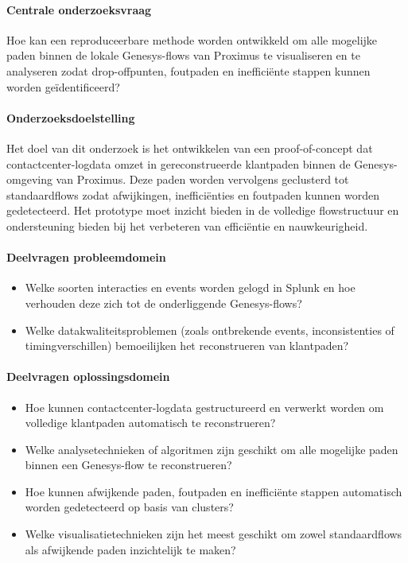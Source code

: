 \paragraph{Centrale onderzoeksvraag}
Hoe kan een reproduceerbare methode worden ontwikkeld om alle mogelijke paden binnen de lokale Genesys-flows van Proximus te visualiseren en te analyseren zodat drop-offpunten, foutpaden en inefficiënte stappen kunnen worden geïdentificeerd?
\paragraph{Onderzoeksdoelstelling}
Het doel van dit onderzoek is het ontwikkelen van een proof-of-concept dat contactcenter-logdata omzet in gereconstrueerde klantpaden binnen de Genesys-omgeving van Proximus. Deze paden worden vervolgens geclusterd tot standaardflows zodat afwijkingen, ineffici\"enties en foutpaden kunnen worden gedetecteerd. Het prototype moet inzicht bieden in de volledige flowstructuur en ondersteuning bieden bij het verbeteren van effici\"entie en nauwkeurigheid.
\paragraph{Deelvragen probleemdomein}
\begin{itemize}
  \item Welke soorten interacties en events worden gelogd in Splunk en hoe verhouden deze zich tot de onderliggende Genesys-flows?
  \item Welke datakwaliteitsproblemen (zoals ontbrekende events, inconsistenties of timingverschillen) bemoeilijken het reconstrueren van klantpaden?
\end{itemize}

\paragraph{Deelvragen oplossingsdomein}
\begin{itemize}
  \item Hoe kunnen contactcenter-logdata gestructureerd en verwerkt worden om volledige klantpaden automatisch te reconstrueren?
  \item Welke analysetechnieken of algoritmen zijn geschikt om alle mogelijke paden binnen een Genesys-flow te reconstrueren?
  \item Hoe kunnen afwijkende paden, foutpaden en inefficiënte stappen automatisch worden gedetecteerd op basis van clusters?
  \item Welke visualisatietechnieken zijn het meest geschikt om zowel standaardflows als afwijkende paden inzichtelijk te maken?
\end{itemize}

